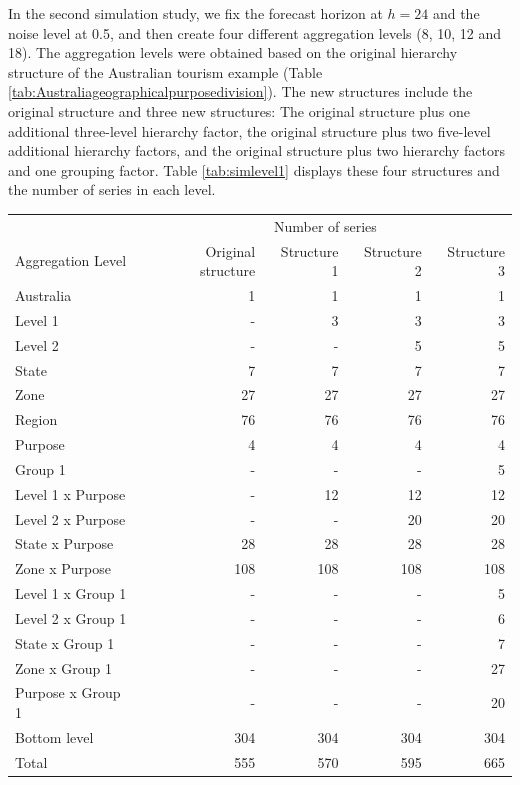 \documentclass[11pt,a4paper,]{article}
\let\origtable\table
\let\endorigtable\endtable
\renewenvironment{table}[1][2] {
    \expandafter\origtable\expandafter[!htbp]
} {
    \endorigtable
}
\begin{document}
In the second simulation study, we fix the forecast horizon at \(h=24\) and the noise level at 0.5, and then create four different aggregation levels (8, 10, 12 and 18). The aggregation levels were obtained based on the original hierarchy structure of the Australian tourism example (Table \ref{tab:Australiageographicalpurposedivision}). The new structures include the original structure and three new structures: The original structure plus one additional three-level hierarchy factor, the original structure plus two five-level additional hierarchy factors, and the original structure plus two hierarchy factors and one grouping factor. Table \ref{tab:simlevel1} displays these four structures and the number of series in each level.

\begin{table}

\caption{\label{tab:simlevel1}Four simulated hierarchy/grouping structures.}
\centering
\begin{tabular}[t]{lrrrr}
\toprule
\multicolumn{1}{c}{} & \multicolumn{4}{c}{Number of series} \\
\cmidrule(l{3pt}r{3pt}){2-5}
Aggregation Level & Original structure & Structure 1 & Structure 2 & Structure 3\\
\midrule
Australia & 1 & 1 & 1 & 1\\
Level 1 & - & 3 & 3 & 3\\
Level 2 & - & - & 5 & 5\\
State & 7 & 7 & 7 & 7\\
Zone & 27 & 27 & 27 & 27\\
Region & 76 & 76 & 76 & 76\\
Purpose & 4 & 4 & 4 & 4\\
Group 1 & - & - & - & 5\\
Level 1 x Purpose & - & 12 & 12 & 12\\
Level 2 x Purpose & - & - & 20 & 20\\
State x Purpose & 28 & 28 & 28 & 28\\
Zone x Purpose & 108 & 108 & 108 & 108\\
Level 1 x Group 1 & - & - & - & 5\\
Level 2 x Group 1 & - & - & - & 6\\
State x Group 1 & - & - & - & 7\\
Zone x Group 1 & - & - & - & 27\\
Purpose x Group 1 & - & - & - & 20\\
Bottom level & 304 & 304 & 304 & 304\\
Total & 555 & 570 & 595 & 665\\
\bottomrule
\end{tabular}
\end{table}
\end{document}
